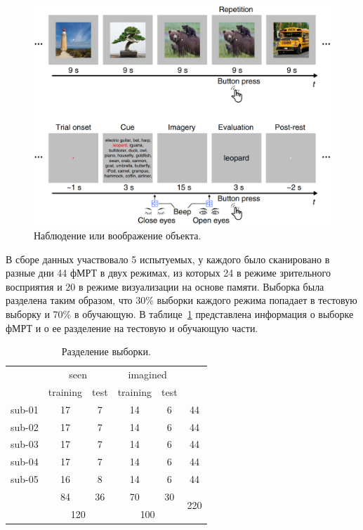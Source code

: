 \documentclass[specialist,
substylefile = spbu_report.rtx,
subf,href,colorlinks=true, 12pt]{disser}
\begin{document}
			\begin{figure}[h]
				\centering
				\includegraphics[width=12cm]{../images/data_3.png}
				\caption{Наблюдение или воображение объекта.} 
				\label{fg:2}
			\end{figure}
		
			В сборе данных участвовало 5 испытуемых, у каждого было сканировано в разные дни 44 фМРТ в двух режимах, из которых 24 в режиме зрительного восприятия и 20 в режиме визуализации на основе памяти. Выборка была разделена таким образом, что 30\% выборки каждого режима попадает в тестовую выборку и 70\% в обучающую. В таблице~\ref{tb:1} представлена информация о выборке фМРТ и о ее разделение на тестовую и обучающую части. 
			
			\begin{table}[h]
				\centering
				\begin{tabular}{c|cc|cc|c}
					& \multicolumn{2}{c|}{seen}            & \multicolumn{2}{c|}{imagined}        &                      \\ \cline{2-5}
					& \multicolumn{1}{c|}{training} & test & \multicolumn{1}{c|}{training} & test &                      \\ \hline
					sub-01 & \multicolumn{1}{c|}{17}       & 7    & \multicolumn{1}{c|}{14}       & 6    & 44                   \\
					sub-02 & \multicolumn{1}{c|}{17}       & 7    & \multicolumn{1}{c|}{14}       & 6    & 44                   \\
					sub-03 & \multicolumn{1}{c|}{17}       & 7    & \multicolumn{1}{c|}{14}       & 6    & 44                   \\
					sub-04 & \multicolumn{1}{c|}{17}       & 7    & \multicolumn{1}{c|}{14}       & 6    & 44                   \\
					sub-05 & \multicolumn{1}{c|}{16}       & 8    & \multicolumn{1}{c|}{14}       & 6    & 44                   \\ \hline
					& \multicolumn{1}{c|}{84}       & 36   & \multicolumn{1}{c|}{70}       & 30   & \multirow{2}{*}{220} \\ \cline{2-5}
					& \multicolumn{2}{c|}{120}             & \multicolumn{2}{c|}{100}             &                     		
				\end{tabular}				
				\caption{\label{tb:1}Разделение выборки.} 
			\end{table}
		
\end{document}

